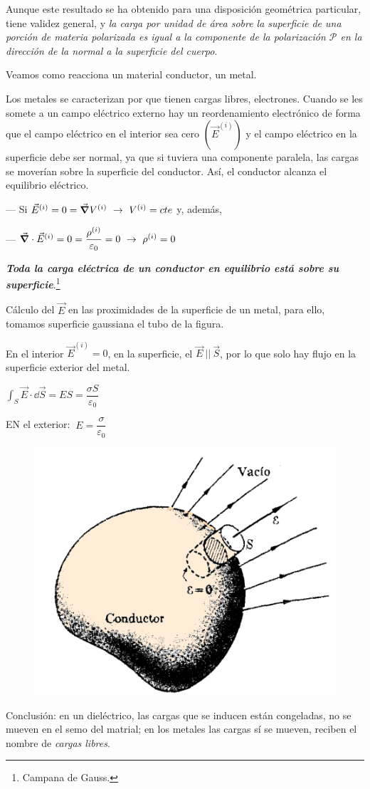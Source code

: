 Aunque este resultado se ha obtenido para una disposición geométrica particular, tiene validez general, y \emph{la carga por unidad de área sobre la superficie de una porción de materia polarizada es igual a la componente de la polarización $\mathcal P$ en la dirección de la normal a la superficie del cuerpo}.


Veamos como reacciona un material conductor, un metal. 

Los metales se caracterizan por que tienen cargas libres, electrones. Cuando se les somete a un campo eléctrico externo hay un reordenamiento electrónico de forma que el campo eléctrico en el interior sea cero $(\vec E^{(i)})$ y el campo eléctrico en la superficie debe ser normal, ya que si tuviera una componente paralela, las cargas se moverían sobre la superficie del conductor. Así, el conductor alcanza el equilibrio eléctrico.

--- Si $\vec E^{(i)}=0 =\vec \grad V^{(i)}\ \to \ V^{(i)}=cte$ y, además, 

--- $\vec \grad \cdot \vec E^{(i)}=0=\dfrac {\rho^{(i)}}{\varepsilon_0}=0 \ \to \ \rho^{(i)}=0$ 

\emph\textbf{{Toda la carga eléctrica de un conductor en equilibrio está sobre su superficie}}.\footnote{Campana de Gauss.}



\begin{multicols}{2}
Cálculo del $\vec E$ en las proximidades de la superficie de un metal, para ello, tomamos superficie gaussiana el tubo de la figura.

En el interior $\vec E^{(i)}=0$, en la superficie, el $\vec E \ || \ \vec S$, por lo que solo hay flujo en la superficie exterior del metal.

$\displaystyle \int_S \vec E \cdot \dd \vec S =ES=\dfrac{\sigma S}{\varepsilon_0}$

EN el exterior: $ \ E=\dfrac \sigma {\varepsilon_0}$

\begin{figure}[H]
	\centering
	\includegraphics[width=.4\textwidth]{imagenes/imagenes24/T24IM09.png}
\end{figure}
\end{multicols}
Conclusión: en un dieléctrico, las cargas que se inducen están congeladas, no se mueven en el semo del matrial; en los metales las cargas sí se mueven, reciben el nombre de \emph{cargas libres}.

